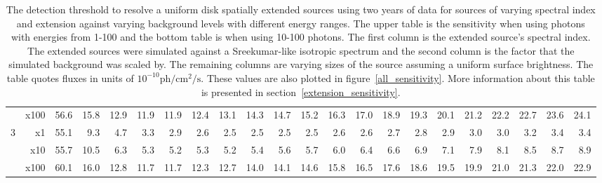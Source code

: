 \documentclass[12pt,preprint]{aastex}
\newcommand{\gev}{\text{GeV}\xspace}
\newcommand{\ph}{\text{ph}\xspace}
\newcommand{\cm}{\text{cm}\xspace}
\renewcommand{\sec}{\text{s}\xspace}
\begin{document}
\begin{appendices}
\begin{table}
\begin{centering}
\begin{tabular}{r|r|rrrrrrrrrrrrrrrrrrrr}
                 &     x100 &       56.6 &       15.8 &       12.9 &       11.9 &       11.9 &       12.4 &       13.1 &       14.3 &       14.7 &       15.2 &       16.3 &       17.0 &       18.9 &       19.3 &       20.1 &       21.2 &       22.2 &       22.7 &       23.6 &       24.1 \\
               3 &       x1 &       55.1 &        9.3 &        4.7 &        3.3 &        2.9 &        2.6 &        2.5 &        2.5 &        2.5 &        2.5 &        2.6 &        2.6 &        2.7 &        2.8 &        2.9 &        3.0 &        3.0 &        3.2 &        3.4 &        3.4 \\
                 &      x10 &       55.7 &       10.5 &        6.3 &        5.3 &        5.2 &        5.3 &        5.2 &        5.4 &        5.6 &        5.7 &        6.0 &        6.4 &        6.6 &        6.9 &        7.1 &        7.9 &        8.1 &        8.5 &        8.7 &        8.9 \\
                 &     x100 &       60.1 &       16.0 &       12.8 &       11.7 &       11.7 &       12.3 &       12.7 &       14.0 &       14.1 &       14.6 &       15.8 &       16.5 &       17.6 &       18.6 &       19.5 &       19.9 &       21.0 &       21.3 &       22.0 &       22.9 \\
        \hline
      \end{tabular}
      \caption{The detection threshold to resolve a uniform disk spatially
      extended sources using two years of data for sources of varying
      spectral index and extension against varying background levels
      with different energy ranges.  The upper table is the sensitivity
      when using photons with energies from 1-100 \gev and the bottom
      table is when using 10-100 \gev photons. The first column is
      the extended source's spectral index.  The extended sources
      were simulated against a Sreekumar-like isotropic spectrum and
      the second column is the factor that the simulated background
      was scaled by. The remaining columns are varying sizes of the
      source assuming a uniform surface brightness. The table quotes fluxes in units of
      $10^{-10} \ph/\cm^2/\sec$.  These values are also plotted in
      figure~\ref{all_sensitivity}.  More information about this
      table is presented in section~\ref{extension_sensitivity}.
      }\label{all_sensitivity_table}
    \end{centering}
  \end{table}

\end{appendices}
\end{document}
